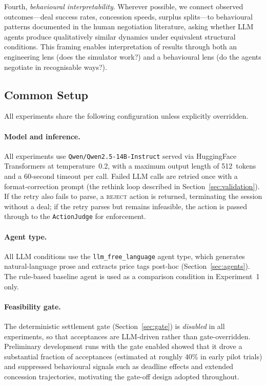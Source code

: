 Fourth, \emph{behavioural interpretability}.  Wherever possible, we connect observed outcomes---deal success rates, concession speeds, surplus splits---to behavioural patterns documented in the human negotiation literature, asking whether LLM agents produce qualitatively similar dynamics under equivalent structural conditions.  This framing enables interpretation of results through both an engineering lens (does the simulator work?) and a behavioural lens (do the agents negotiate in recognisable ways?).

\subsection{Common Setup}
\label{sec:common-setup}

All experiments share the following configuration unless explicitly overridden.

\paragraph{Model and inference.}
All experiments use \texttt{Qwen/Qwen2.5-14B-Instruct} served via HuggingFace Transformers at temperature~0.2, with a maximum output length of 512~tokens and a 60-second timeout per call.  Failed LLM calls are retried once with a format-correction prompt (the rethink loop described in Section~\ref{sec:validation}).  If the retry also fails to parse, a \textsc{reject} action is returned, terminating the session without a deal; if the retry parses but remains infeasible, the action is passed through to the \texttt{ActionJudge} for enforcement.

\paragraph{Agent type.}
All LLM conditions use the \texttt{llm\_free\_language} agent type, which generates natural-language prose and extracts price tags post-hoc (Section~\ref{sec:agents}).  The rule-based baseline agent is used as a comparison condition in Experiment~1 only.

\paragraph{Feasibility gate.}
The deterministic settlement gate (Section~\ref{sec:gate}) is \emph{disabled} in all experiments, so that acceptances are LLM-driven rather than gate-overridden.  Preliminary development runs with the gate enabled showed that it drove a substantial fraction of acceptances (estimated at roughly 40\% in early pilot trials) and suppressed behavioural signals such as deadline effects and extended concession trajectories, motivating the gate-off design adopted throughout.

